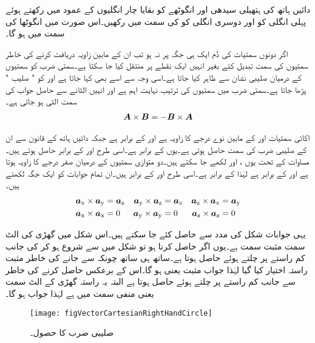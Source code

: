 دائیں ہاتھ کی ہتھیلی  سیدھی اور انگوٹھے کو بقایا چار انگلیوں کے عمود میں رکھتے ہوئے پہلی انگلی کو  اور  دوسری انگلی کو  کی سمت میں رکھیں۔اس صورت میں انگوٹھا  کی سمت میں ہو گا۔  

اگر دونوں سمتیات کی دُم ایک ہی جگہ پر نہ ہو تب ان کے مابین زاویہ دریافت کرنے کی  خاطر سمتیوں کی سمت تبدیل کئے بغیر انہیں ایک نقطے پر منتقل کیا جا سکتا ہے۔سمتی ضرب کو سمتیوں کے درمیان صلیبی نشان  سے ظاہر کیا جاتا ہے۔اسی وجہ سے اسے  بھی کہا جاتا ہے اور  کو " صلیب " پڑھا جاتا ہے۔سمتی ضرب میں سمتیوں کی ترتیب نہایت اہم ہے اور انہیں الٹانے سے حاصل جواب کی سمت الٹی ہو جاتی ہے۔
\begin{align}\label{مساوات_سمتیہ_صلیبی_ضرب_ترتیب_الٹاتے_منفی_سمت}
{\ensuremath{{\boldsymbol{A}}}} \times {\ensuremath{{\boldsymbol{B}}}}=- {{\boldsymbol{B}}} \times {\ensuremath{{\boldsymbol{A}}}}
\end{align}

اکائی سمتیات  اور  کے مابین نوے درجے کا زاویہ ہے  اور  کے برابر ہے جبکہ دائیں ہاتھ کے قانون سے ان کے صلیبی ضرب کی سمت  حاصل ہوتی ہے۔یوں  کے برابر ہے۔اسی طرح  اور  کے برابر حاصل ہوتے ہیں۔مساوات  کے تحت یوں ،  اور  لکھے جا سکتے ہیں۔دو متوازی سمتیوں کے درمیان صفر درجے کا زاویہ ہوتا ہے اور  کے برابر ہے لہٰذا  کے برابر ہے۔اسی طرح  اور  کے برابر ہیں۔ان تمام جوابات کو ایک جگہ لکھتے ہیں۔
\begin{gather}
\begin{aligned}\label{مساوات_سمتیہ_کارتیسی_اکائی_سمتیات_صلیبی_ضرب}
{\boldsymbol{a}}_{\textup{x}} \times {\boldsymbol{a}}_{\textup{y}} &={\boldsymbol{a}}_{\textup{z}} & {\boldsymbol{a}}_{\textup{y}} \times {\boldsymbol{a}}_{\textup{z}}&={\boldsymbol{a}}_{\textup{x}} & {\boldsymbol{a}}_{\textup{z}} \times {\boldsymbol{a}}_{\textup{x}}&={\boldsymbol{a}}_{\textup{y}}\\
{\boldsymbol{a}}_{\textup{x}} \times {\boldsymbol{a}}_{\textup{x}}&=0 & {\boldsymbol{a}}_{\textup{y}} \times {\boldsymbol{a}}_{\textup{y}}&=0 & {\boldsymbol{a}}_{\textup{z}} \times {\boldsymbol{a}}_{\textup{z}}&=0
\end{aligned}
\end{gather}

یہی جوابات شکل  کی مدد سے حاصل کئے جا سکتے ہیں۔اس شکل میں گھڑی کی الٹ سمت مثبت سمت ہے۔یوں اگر  حاصل کرنا ہو تو شکل میں  سے شروع ہو کر  کی جانب کم راستے پر چلتے ہوئے   حاصل ہوتا ہے۔ساتھ ہی ساتھ چونکہ  سے  جانے کی خاطر  مثبت راستہ اختیار کیا گیا لہٰذا جواب مثبت یعنی  ہو گا۔اس کے برعکس  حاصل کرنے کی خاطر  سے  جانب کم راستے پر چلتے ہوئے  حاصل ہوتا ہے البتہ یہ راستہ گھڑی کے الٹ سمت یعنی منفی سمت میں ہے لہٰذا جواب  ہو گا۔ 
\begin{figure}
\centering
\texttt{[image: figVectorCartesianRightHandCircle]}
\caption{صلیبی ضرب کا حصول۔}
\label{شکل_سمتیہ_صلیبی_ضرب_مثبت_دائرہ}
\end{figure}

